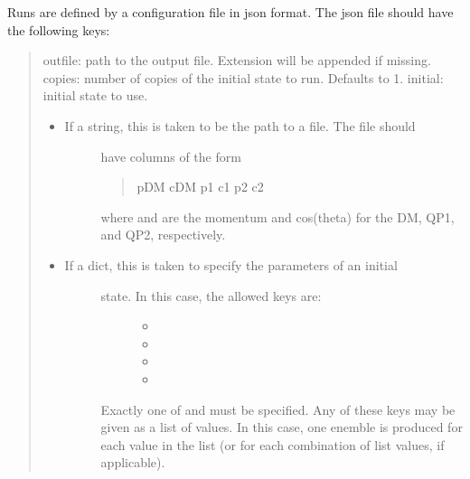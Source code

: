 \documentclass[letterpaper,10pt,english]{sphinxmanual}
\begin{document}
Runs are defined by a configuration file in json format. The json file should
have the following keys:
\begin{quote}

outfile: path to the output file. Extension will be appended if missing.
copies: number of copies of the initial state to run. Defaults to 1.
initial: initial state to use.
\begin{itemize}
\item {} \begin{description}
\item[{If a string, this is taken to be the path to a file. The file should}] \leavevmode
have columns of the form
\begin{quote}

pDM  cDM  p1  c1  p2  c2
\end{quote}

where  and  are the momentum and cos(theta) for the DM, QP1,
and QP2, respectively.

\end{description}

\item {} \begin{description}
\item[{If a dict, this is taken to specify the parameters of an initial}] \leavevmode\begin{description}
\item[{state. In this case, the allowed keys are:}] \leavevmode\begin{itemize}
\item {} 

\item {} 

\item {} 

\item {} 

\end{itemize}

\end{description}

Exactly one of  and  must be specified. Any of
these keys may be given as a list of values. In this case, one
enemble is produced for each value in the list (or for each
combination of list values, if applicable).

\end{description}


\end{itemize}
\end{quote}
\end{document}
